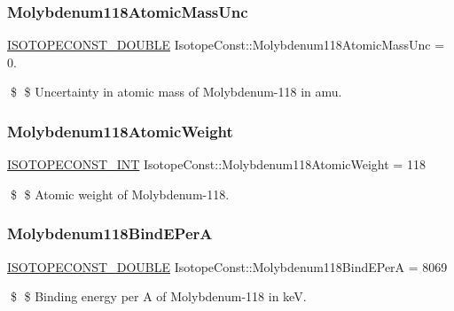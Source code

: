 \subsubsection{\texorpdfstring{Molybdenum118\+Atomic\+Mass\+Unc}{Molybdenum118AtomicMassUnc}}
{\footnotesize\ttfamily \mbox{\hyperlink{group___isotope_const-_macros_ga8f45a7272ce02c0b4c65c44636ed719a}{I\+S\+O\+T\+O\+P\+E\+C\+O\+N\+S\+T\+\_\+\+D\+O\+U\+B\+LE}} Isotope\+Const\+::\+Molybdenum118\+Atomic\+Mass\+Unc = 0.}

\$ \$ Uncertainty in atomic mass of Molybdenum-\/118 in amu. \mbox{\label{group___isotope_const-_molybdenum-_mo118_ga001ee85e8abfede410f992c144f88cac}} 
\subsubsection{\texorpdfstring{Molybdenum118\+Atomic\+Weight}{Molybdenum118AtomicWeight}}
{\footnotesize\ttfamily \mbox{\hyperlink{group___isotope_const-_macros_ga5f18360b3e99483a35c32d789e62621c}{I\+S\+O\+T\+O\+P\+E\+C\+O\+N\+S\+T\+\_\+\+I\+NT}} Isotope\+Const\+::\+Molybdenum118\+Atomic\+Weight = 118}

\$ \$ Atomic weight of Molybdenum-\/118. \mbox{\label{group___isotope_const-_molybdenum-_mo118_ga7085c8ababe72130742f02b0b4e23eff}} 
\subsubsection{\texorpdfstring{Molybdenum118\+Bind\+E\+PerA}{Molybdenum118BindEPerA}}
{\footnotesize\ttfamily \mbox{\hyperlink{group___isotope_const-_macros_ga8f45a7272ce02c0b4c65c44636ed719a}{I\+S\+O\+T\+O\+P\+E\+C\+O\+N\+S\+T\+\_\+\+D\+O\+U\+B\+LE}} Isotope\+Const\+::\+Molybdenum118\+Bind\+E\+PerA = 8069}

\$ \$ Binding energy per A of Molybdenum-\/118 in keV. \mbox{\label{group___isotope_const-_molybdenum-_mo118_ga32619b1bbbac227ec41f9db4529f4086}} 
